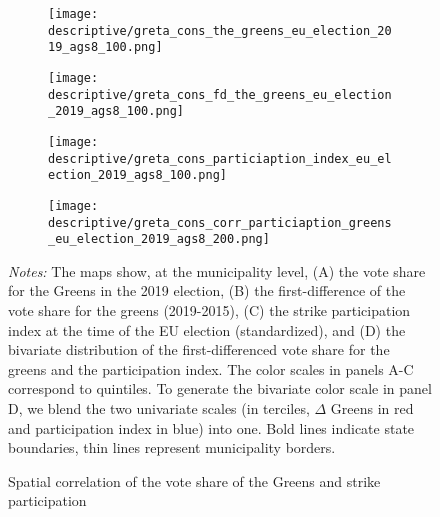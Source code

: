 \begin{figure}[H]\centering
	\begin{subfigure}[h]{0.49\linewidth}\centering
		\texttt{[image: descriptive/greta\_cons\_the\_greens\_eu\_election\_2019\_ags8\_100.png]}
	\end{subfigure}
	\begin{subfigure}[h]{0.49\linewidth}\centering
		\texttt{[image: descriptive/greta\_cons\_fd\_the\_greens\_eu\_election\_2019\_ags8\_100.png]}
	\end{subfigure}
	\begin{subfigure}[h]{0.49\linewidth}\centering
		\texttt{[image: descriptive/greta\_cons\_particiaption\_index\_eu\_election\_2019\_ags8\_100.png]}
	\end{subfigure}
	\begin{subfigure}[h]{0.49\linewidth}\centering
		\texttt{[image: descriptive/greta\_cons\_corr\_particiaption\_greens\_eu\_election\_2019\_ags8\_200.png]}
	\end{subfigure}
	\begin{minipage}{\linewidth}
		\caption{Spatial correlation of the vote share of the Greens and strike participation}
		\label{fig_greta_cons:spatial_correlation_greens_index}
		\scriptsize{\emph{Notes:} The maps show, at the municipality level, (A) the vote share for the Greens in the 2019 election, (B) the first-difference of the vote share for the greens (2019-2015), (C) the strike participation index at the time of the EU election (standardized), and (D) the bivariate distribution of the first-differenced vote share for the greens and the participation index. The color scales in panels A-C correspond to quintiles. To generate the bivariate color scale in panel D, we blend the two univariate scales (in terciles, $\Delta$ Greens in red and participation index in blue) into one. Bold lines indicate state boundaries, thin lines represent municipality borders.}
	\end{minipage}
\end{figure}





